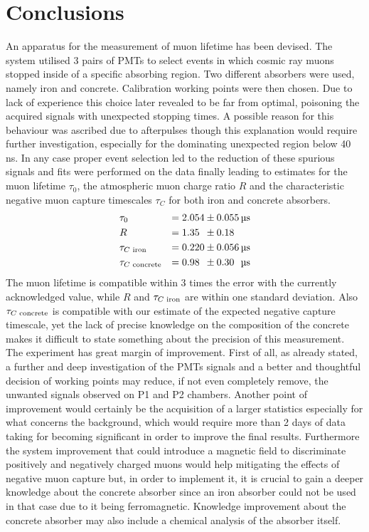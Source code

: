 \documentclass[../main.tex]{subfiles}
\begin{document}
\section{Conclusions}

An apparatus for the measurement of muon lifetime has been devised. The system utilised 3 pairs of PMTs to select events in which cosmic ray muons stopped inside of a specific absorbing region. Two different absorbers were used, namely iron and concrete. Calibration working points were then chosen. Due to lack of experience this choice later revealed to be far from optimal, poisoning the acquired signals with unexpected stopping times. A possible reason for this behaviour was ascribed due to afterpulses though this explanation would require further investigation, especially for the dominating unexpected region below 40\,ns. In any case proper event selection led to the reduction of these spurious signals and fits were performed on the data finally leading to estimates for the muon lifetime $\tau_0$, the atmospheric muon charge ratio $R$ and the characteristic negative muon capture timescales $\tau_C$ for both iron and concrete absorbers.
\begin{alignat*}{3}
    &\tau_0 & =2.054&\pm 0.055\, \si{\micro \second} \\
    &R &=1.35\phantom{0}&\pm 0.18\phantom{0} \\
    &\tau_{C\textnormal{ iron}} & =0.220&\pm 0.056\, \si{\micro \second} \\
    &\tau_{C\textnormal{ concrete}} & =0.98\phantom{0}&\pm 0.30\phantom{0}\, \si{\micro \second}
\end{alignat*}
The muon lifetime is compatible within 3 times the error with the currently acknowledged value, while $R$ and $\tau_{C\textnormal{ iron}}$ are within one standard deviation. Also $\tau_{C\textnormal{ concrete}}$ is compatible with our estimate of the expected negative capture timescale, yet the lack of precise knowledge on the composition of the concrete makes it difficult to state something about the precision of this measurement.\\

The experiment has great margin of improvement. First of all, as already stated, a further and deep investigation of the PMTs signals and a better and thoughtful decision of working points may reduce, if not even completely remove, the unwanted signals observed on P1 and P2 chambers. Another point of improvement would certainly be the acquisition of a larger statistics especially for what concerns the background, which would require more than 2 days of data taking for becoming significant in order to improve the final results. Furthermore the system improvement that could introduce a magnetic field to discriminate positively and negatively charged muons would help mitigating the effects of negative muon capture but, in order to implement it, it is crucial to gain a deeper knowledge about the concrete absorber since an iron absorber could not be used in that case due to it being ferromagnetic. Knowledge improvement about the concrete absorber may also include a chemical analysis of the absorber itself.
\end{document}
